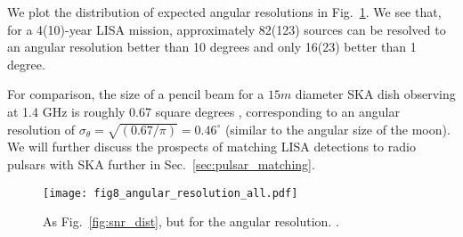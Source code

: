 We plot the distribution of expected angular resolutions in Fig.~\ref{fig:ang_res}. We see that, for a 4(10)-year LISA mission, approximately 82(123) sources can be resolved to an angular resolution better than 10 degrees and only 16(23) better than 1 degree. 

For comparison, the size of a pencil beam for a $15 \unit{m}$ diameter SKA dish observing at 1.4 GHz is roughly 0.67 square degrees \citep{Smits+2009}, corresponding to an angular resolution of $\sigma_\theta = \sqrt{(0.67 / \pi)} = 0.46^\circ$ (similar to the angular size of the moon). We will further discuss the prospects of matching LISA detections to radio pulsars with SKA further in Sec.~\ref{sec:pulsar_matching}.

\begin{figure}[htb]
    \centering
    \texttt{[image: fig8\_angular\_resolution\_all.pdf]}
    \caption{As Fig.~\ref{fig:snr_dist}, but for the angular resolution. \href{https://github.com/TomWagg/detecting-DCOs-in-LISA/blob/main/paper/figures/fig8_angular_resolution_all.pdf}{\faFileImage} \href{https://github.com/TomWagg/detecting-DCOs-in-LISA/blob/main/paper/figure_notebooks/fiducial.ipynb}{\faBook}.}
    \label{fig:ang_res}
\end{figure}